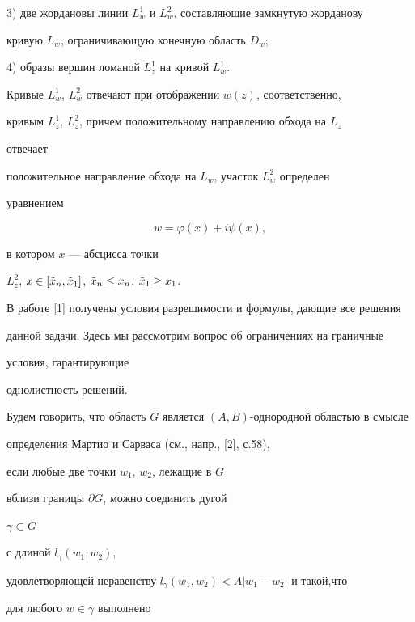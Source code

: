 3) две жордановы линии $L_w^1$ и $L_w^2$, составляющие замкнутую жорданову 


кривую $L_w$, ограничивающую конечную область $D_w$;





4) образы вершин ломаной $L_z^1$ на кривой $L_w^1$.





Кривые $L_w^1$, $L_w^2$ отвечают при отображении $w(z)$, соответственно,


кривым $L_z^1$, $L_z^2$, причем положительному направлению обхода на $L_z$


отвечает


положительное направление обхода на $L_w$, участок $L_w^2$ определен 


уравнением


\begin{equation}


w=\varphi(x)+i\psi(x),


\end{equation}


в котором $x$ --- абсцисса точки


$L_z^2$, $x\in[\Tilde x_n,\Tilde x_1]$, $\Tilde x_n\le


x_n$, $\Tilde x_1\ge x_1$.





В работе [1] получены условия разрешимости и формулы, дающие все решения


данной задачи. Здесь мы рассмотрим вопрос об ограничениях на граничные


условия, гарантирующие


однолистность решений.





Будем говорить, что область $G$ является $(A,B)$-однородной областью в смысле


определения Мартио и Сарваса (см., напр., [2], с.58),


если любые две точки $w_1$, $w_2$, лежащие в $G$


вблизи границы $\partial G$, можно соединить дугой


$\gamma\subset G$


с длиной $l_\gamma (w_1,w_2)$,


удовлетворяющей неравенству $l_\gamma (w_1,w_2)<A|w_1-w_2|$ и такой,что


для любого $w\in\gamma$ выполнено


